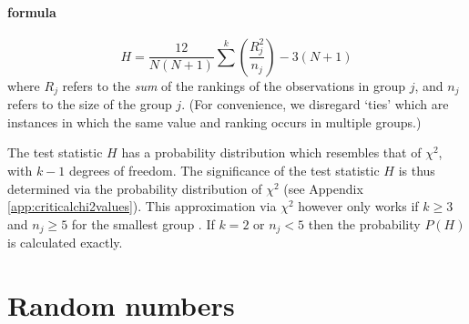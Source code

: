 \documentclass[
]{book}
\begin{document}
\hypertarget{formula-1}{%
\subsubsection{formula}\label{formula-1}}

\begin{equation}
  \label{eq:kruskall-wallis-H}
    H = \frac{12}{N(N+1)} \sum^{k} (\frac{R^2_j}{n_j}) - 3(N+1)
\end{equation}
where \(R_j\) refers to the \emph{sum} of the rankings of the observations
in group \(j\), and \(n_j\) refers to the size of the group \(j\).
(For convenience, we disregard `ties'
which are instances in which the same value and ranking occurs in
multiple groups.)

The test statistic \(H\) has a probability distribution which resembles that of
\(\chi^2\), with \(k-1\) degrees of freedom. The significance of the
test statistic \(H\) is thus determined via the probability distribution of
\(\chi^2\) (see Appendix \ref{app:criticalchi2values}).
This approximation via \(\chi^2\) however only works if \(k\ge3\)
and \(n_j\ge5\) for the smallest group \citep{Ferg89}.
If \(k=2\) or \(n_j<5\) then the probability \(P(H)\) is calculated exactly.

\hypertarget{appendix-appendices}{%
\appendix}


\hypertarget{app:randomnumbers}{%
\chapter{Random numbers}\label{app:randomnumbers}}
\end{document}
